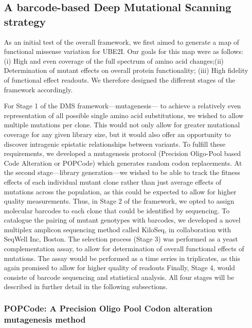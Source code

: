 \subsection{A barcode-based Deep Mutational Scanning strategy}


As an initial test of the overall framework, we first aimed to generate a map of functional missense variation for UBE2I. Our goals for this map were as follows: (i) High and even coverage of the full spectrum of amino acid changes;(ii) Determination of mutant effects on overall protein functionality; (iii) High fidelity of functional effect readouts. We therefore designed the different stages of the framework accordingly. 

For Stage 1 of the DMS framework---mutagenesis--- to achieve a relatively even representation of all possible single amino acid substitutions, we wished to allow multiple mutations per clone. This would not only allow for greater mutational coverage for any given library size, but it would also offer an opportunity to discover intragenic epistatic relationships between variants.  To fulfill these requirements, we developed a mutagenesis protocol (Precision Oligo-Pool based Code Alteration or POPCode) which generates random codon replacements. 
At the second stage---library generation---we wished to be able to track the fitness effects of each individual mutant clone rather than just average effects of mutations across the population, as this could be expected to allow for higher quality measurements. Thus, in Stage 2 of the framework, we opted to assign molecular barcodes to each clone that could be identified by sequencing. To catalogue the pairing of mutant genotypes with barcodes, we developed a novel multiplex amplicon sequencing method called KiloSeq, in collaboration with SeqWell Inc, Boston. 
The selection process (Stage 3) was performed as a yeast complementation assay, to allow for determination of overall functional effects of mutations. The assay would be performed as a time series in triplicates, as this again promised to allow for higher quality of readouts 
Finally, Stage 4, would consiste of barcode sequencing and statistical analysis. All four stages will be described in further detail in the following subsections.


\subsubsection{POPCode: A Precision Oligo Pool Codon alteration mutagenesis method}

